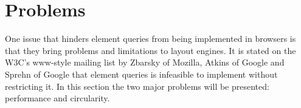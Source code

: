 \documentclass[a4paper,11pt]{kth-mag}
\begin{document}

    \section{Problems}\label{sec:eq-problems}
      One issue that hinders element queries from being implemented  in \glspl{browser} is that they bring problems and limitations to \glspl{layout engine}.
      It is stated on the W3C's www-style mailing list \cite{w3c_eq_mail} by Zbarsky of Mozilla, Atkins of Google and Sprehn of Google that element queries is infeasible to implement without restricting it.
      In this section the two major problems will be presented: performance and circularity.
\end{document}

